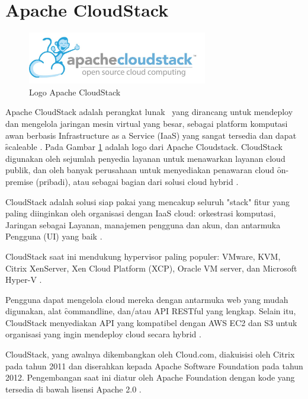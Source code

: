 \section{Apache CloudStack}
\begin{figure}
	\centering
	\includegraphics[width=0.70\textwidth]
	{assets/pics/apache_cloudstack_with_cloud_monkey.jpg}
	\caption{Logo Apache CloudStack}
	\label{fig:LogoApacheCloudStack}
\end{figure}
Apache CloudStack adalah perangkat lunak \oss\ yang dirancang untuk mendeploy dan mengelola jaringan mesin virtual yang besar, sebagai platform komputasi awan berbasis Infrastructure as a Service (IaaS) yang sangat tersedia dan dapat \f{scaleable} \cite{cloudstackabout}. Pada Gambar \ref{fig:LogoApacheCloudStack} adalah logo dari Apache Cloudstack. CloudStack digunakan oleh sejumlah penyedia layanan untuk menawarkan layanan cloud publik, dan oleh banyak perusahaan untuk menyediakan penawaran cloud \f{on-premise} (pribadi), atau sebagai bagian dari solusi cloud hybrid \cite{cloudstackabout}.

CloudStack adalah solusi siap pakai yang mencakup seluruh "stack" fitur yang paling diinginkan oleh organisasi dengan IaaS cloud: orkestrasi komputasi, Jaringan sebagai Layanan, manajemen pengguna dan akun, dan antarmuka Pengguna (UI) yang baik \cite{cloudstackabout}.

CloudStack saat ini mendukung hypervisor paling populer: VMware, KVM, Citrix XenServer, Xen Cloud Platform (XCP), Oracle VM server, dan Microsoft Hyper-V \cite{cloudstackabout}.

Pengguna dapat mengelola cloud mereka dengan antarmuka web yang mudah digunakan, alat \f{commandline}, dan/atau API RESTful yang lengkap. Selain itu, CloudStack menyediakan API yang kompatibel dengan AWS EC2 dan S3 untuk organisasi yang ingin mendeploy cloud secara hybrid \cite{cloudstackabout}.

CloudStack, yang awalnya dikembangkan oleh Cloud.com, diakuisisi oleh Citrix pada tahun 2011 dan diserahkan kepada Apache Software Foundation pada tahun 2012. Pengembangan saat ini diatur oleh Apache Foundation dengan kode yang tersedia di bawah lisensi Apache 2.0 \cite{techtargetcloudstack}.

